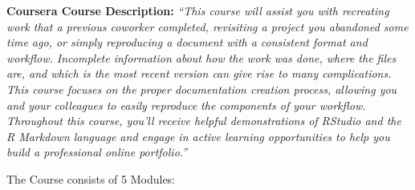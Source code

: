 \documentclass[]{book}
\theoremstyle{definition}
\theoremstyle{definition}
\theoremstyle{definition}
\theoremstyle{remark}
\begin{document}
\textbf{Coursera Course Description:} \emph{``This course will assist
you with recreating work that a previous coworker completed, revisiting
a project you abandoned some time ago, or simply reproducing a document
with a consistent format and workflow. Incomplete information about how
the work was done, where the files are, and which is the most recent
version can give rise to many complications. This course focuses on the
proper documentation creation process, allowing you and your colleagues
to easily reproduce the components of your workflow. Throughout this
course, you'll receive helpful demonstrations of RStudio and the R
Markdown language and engage in active learning opportunities to help
you build a professional online portfolio.''}

The Course consists of 5 Modules:
\end{document}
